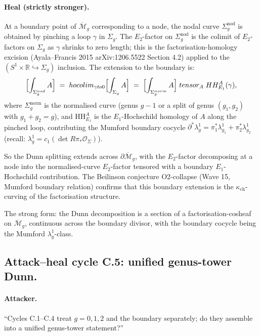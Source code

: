 \documentclass[11pt]{article}
\newcommand{\Eone}{E_{1}}
\newcommand{\Etwo}{E_{2}}
\newcommand{\R}{\mathbb{R}}
\newcommand{\HH}{\mathrm{HH}}
\newcommand{\cM}{\mathcal{M}}
\newcommand{\cO}{\mathcal{O}}
\begin{document}
\paragraph{Heal (strictly stronger).}
At a boundary point of $\overline{\cM}_g$ corresponding to a node,
the nodal curve $\Sigma_g^{\mathrm{nod}}$ is obtained by pinching a
loop $\gamma$ in $\Sigma_g$. The $\Etwo$-factor on
$\Sigma_g^{\mathrm{nod}}$ is the colimit of $\Etwo$-factors on
$\Sigma_g$ as $\gamma$ shrinks to zero length; this is the
factorisation-homology excision (Ayala--Francis 2015 arXiv:1206.5522
Section 4.2) applied to the $(S^1 \times \R \hookrightarrow \Sigma_g)$
inclusion. The extension to the boundary is:
\[
  \Bigl[\int_{\Sigma_g^{\mathrm{nod}}} A\Bigr]
  \;=\;
  \mathrm{hocolim}_{\gamma \to 0}
  \Bigl[\int_{\Sigma_g} A\Bigr]
  \;=\;
  \Bigl[\int_{\Sigma_g^{\mathrm{norm}}} A\Bigr]
  \;\otimes_A\; \HH^A_{\Eone}(\gamma),
\]
where $\Sigma_g^{\mathrm{norm}}$ is the normalised curve (genus $g - 1$
or a split of genus $(g_1, g_2)$ with $g_1 + g_2 = g$), and $\HH^A_{\Eone}$
is the $\Eone$-Hochschild homology of $A$ along the pinched loop,
contributing the Mumford boundary cocycle
$\partial^* \lambda_g^1 = \pi_1^* \lambda_{g_1}^1 + \pi_2^*
\lambda_{g_2}^1$ (recall: $\lambda_g^1 = c_1(\det R\pi_* \cO_\Sigma)$).

So the Dunn splitting extends across $\partial\overline{\cM}_g$, with
the $\Etwo$-factor decomposing at a node into the normalised-curve
$\Etwo$-factor tensored with a boundary $\Eone$-Hochschild contribution.
The Beilinson conjecture O2-collapse (Wave 15, Mumford boundary
relation) confirms that this boundary extension is the
$\kappa_{\mathrm{ch}}$-curving of the factorisation structure.

The strong form: the Dunn decomposition is a section of a
factorisation-cosheaf on $\overline{\cM}_g$, continuous across the
boundary divisor, with the boundary cocycle being the Mumford
$\lambda_g^1$-class.

\subsection{Attack--heal cycle C.5: unified genus-tower Dunn.}

\paragraph{Attacker.}
``Cycles C.1--C.4 treat $g = 0, 1, 2$ and the boundary separately; do they
assemble into a unified genus-tower statement?''
\end{document}
